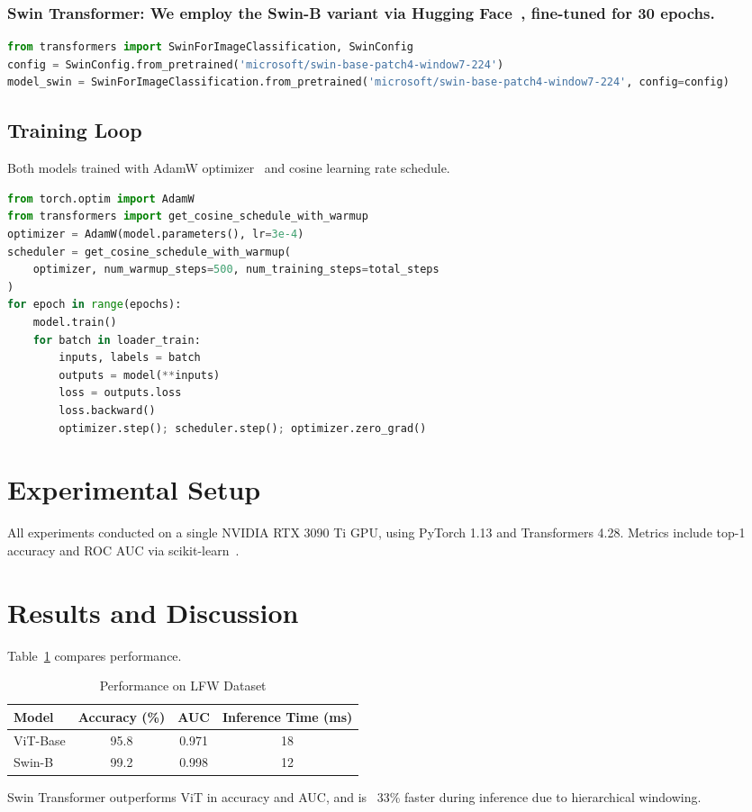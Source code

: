 \documentclass[twocolumn]{IEEEtran}
\begin{document}
\subsubsection{Swin Transformer: We employ the Swin-B variant via Hugging Face~\cite{huggingface_swin}, fine-tuned for 30 epochs.}
\begin{lstlisting}[language=Python, caption=Swin Transformer Initialization]
from transformers import SwinForImageClassification, SwinConfig
config = SwinConfig.from_pretrained('microsoft/swin-base-patch4-window7-224')
model_swin = SwinForImageClassification.from_pretrained('microsoft/swin-base-patch4-window7-224', config=config)
\end{lstlisting}

\subsection{Training Loop}
\setlength{\parindent}{4em}
Both models trained with AdamW optimizer~\cite{loshchilov2019decoupled} and cosine learning rate schedule.
\begin{lstlisting}[language=Python, caption=Training Loop Snippet]
from torch.optim import AdamW
from transformers import get_cosine_schedule_with_warmup
optimizer = AdamW(model.parameters(), lr=3e-4)
scheduler = get_cosine_schedule_with_warmup(
    optimizer, num_warmup_steps=500, num_training_steps=total_steps
)
for epoch in range(epochs):
    model.train()
    for batch in loader_train:
        inputs, labels = batch
        outputs = model(**inputs)
        loss = outputs.loss
        loss.backward()
        optimizer.step(); scheduler.step(); optimizer.zero_grad()
\end{lstlisting}

\section{Experimental Setup}
All experiments conducted on a single NVIDIA RTX 3090 Ti GPU, using PyTorch 1.13 and Transformers 4.28. Metrics include top-1 accuracy and ROC AUC via scikit-learn~\cite{pedregosa2011scikit}.

\section{Results and Discussion}
\setlength{\parindent}{0pt}
Table~\ref{tab:results} compares performance.
\begin{table}[H]
\centering
\caption{Performance on LFW Dataset}
\label{tab:results}
\begin{tabular}{lccc}
\hline
Model        & Accuracy (\%) & AUC    & Inference Time (ms) \\
\hline
ViT-Base     & 95.8          & 0.971  & 18                  \\
Swin-B       & 99.2          & 0.998  & 12                  \\
\hline
\end{tabular}
\end{table}
Swin Transformer outperforms ViT in accuracy and AUC, and is ~33\% faster during inference due to hierarchical windowing.
\end{document}
